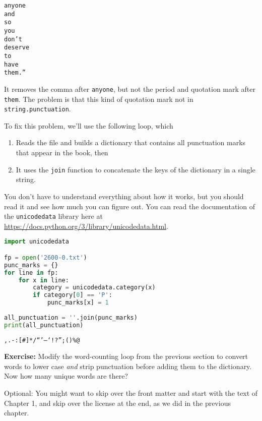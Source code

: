 \begin{lstlisting}[style=output]
anyone
and
so
you
don’t
deserve
to
have
them.”
\end{lstlisting}

It removes the comma after \passthrough{\lstinline!anyone!}, but not the
period and quotation mark after \passthrough{\lstinline!them!}. The
problem is that this kind of quotation mark not in
\passthrough{\lstinline!string.punctuation!}.

To fix this problem, we'll use the following loop, which

\begin{enumerate}
\def\labelenumi{\arabic{enumi}.}
\item
  Reads the file and builds a dictionary that contains all punctuation
  marks that appear in the book, then
\item
  It uses the \passthrough{\lstinline!join!} function to concatenate the
  keys of the dictionary in a single string.
\end{enumerate}

You don't have to understand everything about how it works, but you
should read it and see how much you can figure out. You can read the
documentation of the \passthrough{\lstinline!unicodedata!} library here
at \url{https://docs.python.org/3/library/unicodedata.html}.

\begin{lstlisting}[language=Python,style=source]
import unicodedata

fp = open('2600-0.txt')
punc_marks = {}
for line in fp:
    for x in line:
        category = unicodedata.category(x)
        if category[0] == 'P':
            punc_marks[x] = 1
        
all_punctuation = ''.join(punc_marks)
print(all_punctuation)
\end{lstlisting}

\begin{lstlisting}[style=output]
,.-:[#]*/“’—‘!?”;()%@
\end{lstlisting}

\textbf{Exercise:} Modify the word-counting loop from the previous
section to convert words to lower case \emph{and} strip punctuation
before adding them to the dictionary. Now how many unique words are
there?

Optional: You might want to skip over the front matter and start with
the text of Chapter 1, and skip over the license at the end, as we did
in the previous chapter.

